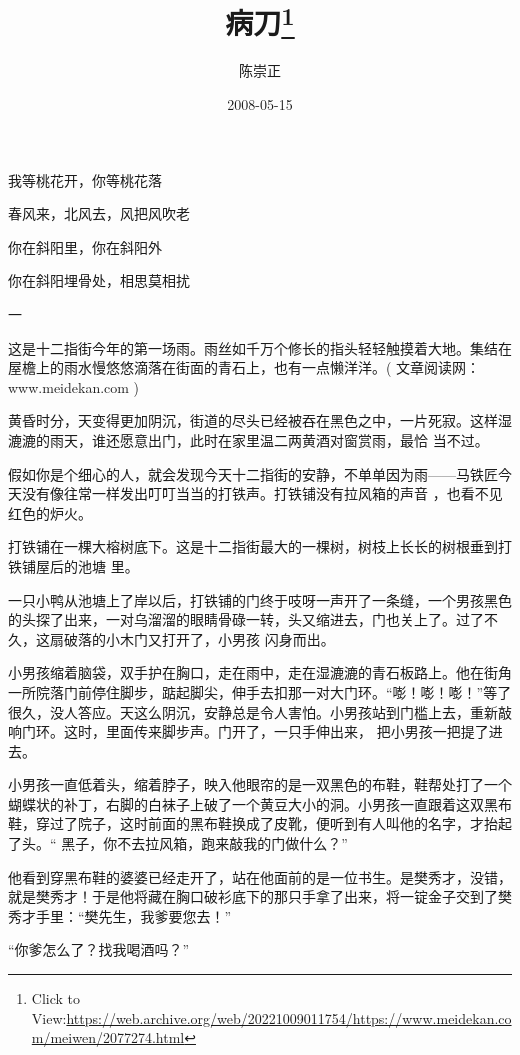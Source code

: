 \documentclass{article}
\title{病刀\footnote{Click to View:\url{https://web.archive.org/web/20221009011754/https://www.meidekan.com/meiwen/2077274.html}}}
\author{陈崇正}
\date{2008-05-15}
\begin{document}

\maketitle


\Large


﻿我等桃花开，你等桃花落 


春风来，北风去，风把风吹老 


你在斜阳里，你在斜阳外 


你在斜阳埋骨处，相思莫相扰 


一 

这是十二指街今年的第一场雨。雨丝如千万个修长的指头轻轻触摸着大地。集结在屋檐上的雨水慢悠悠滴落在街面的青石上，也有一点懒洋洋。( 文章阅读网：www.meidekan.com )

\newpage
 

黄昏时分，天变得更加阴沉，街道的尽头已经被吞在黑色之中，一片死寂。这样湿漉漉的雨天，谁还愿意出门，此时在家里温二两黄酒对窗赏雨，最恰
当不过。 

假如你是个细心的人，就会发现今天十二指街的安静，不单单因为雨——马铁匠今天没有像往常一样发出叮叮当当的打铁声。打铁铺没有拉风箱的声音
，也看不见红色的炉火。 

打铁铺在一棵大榕树底下。这是十二指街最大的一棵树，树枝上长长的树根垂到打铁铺屋后的池塘
里。 

一只小鸭从池塘上了岸以后，打铁铺的门终于吱呀一声开了一条缝，一个男孩黑色的头探了出来，一对乌溜溜的眼睛骨碌一转，头又缩进去，门也关上了。过了不久，这扇破落的小木门又打开了，小男孩
闪身而出。 

\newpage

小男孩缩着脑袋，双手护在胸口，走在雨中，走在湿漉漉的青石板路上。他在街角一所院落门前停住脚步，踮起脚尖，伸手去扣那一对大门环。“嘭！嘭！嘭！”等了很久，没人答应。天这么阴沉，安静总是令人害怕。小男孩站到门槛上去，重新敲响门环。这时，里面传来脚步声。门开了，一只手伸出来，
把小男孩一把提了进去。 

小男孩一直低着头，缩着脖子，映入他眼帘的是一双黑色的布鞋，鞋帮处打了一个蝴蝶状的补丁，右脚的白袜子上破了一个黄豆大小的洞。小男孩一直跟着这双黑布鞋，穿过了院子，这时前面的黑布鞋换成了皮靴，便听到有人叫他的名字，才抬起了头。“
黑子，你不去拉风箱，跑来敲我的门做什么？” 

他看到穿黑布鞋的婆婆已经走开了，站在他面前的是一位书生。是樊秀才，没错，就是樊秀才！于是他将藏在胸口破衫底下的那只手拿了出来，将一锭金子交到了樊秀才手里：“樊先生，我爹要您去！”


\newpage

“你爹怎么了？找我喝酒吗？” 
\end{document}
